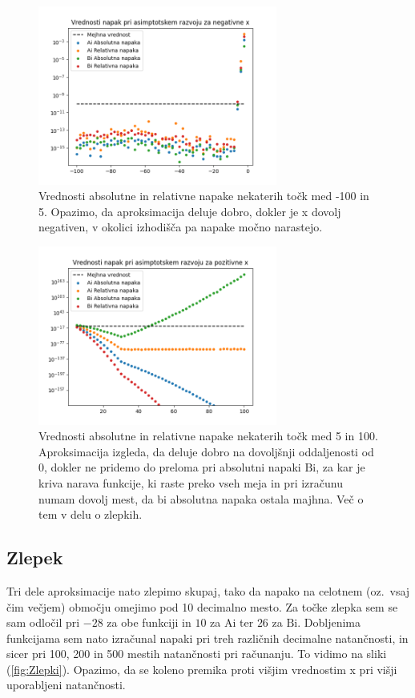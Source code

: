 \documentclass[12pt]{article}
\newcommand{\Ai}{\mathrm{Ai}}
\newcommand{\Bi}{\mathrm{Bi}}
\begin{document}
\begin{figure}
    \centering
    \includegraphics[width=0.7\textwidth]{NapakeAsimptotskoNeg.png}
    \caption{\label{fig:NapakeNeg} Vrednosti absolutne in relativne napake nekaterih točk med -100 in 5. Opazimo, da aproksimacija deluje dobro, dokler je x dovolj negativen, v okolici izhodišča pa napake močno narastejo.}
\end{figure}
\begin{figure}
    \centering
    \includegraphics[width=0.7\textwidth]{NapakeAsimptotskoPoz.png}
    \caption{\label{fig:NapakePoz} Vrednosti absolutne in relativne napake nekaterih točk med 5 in 100. Aproksimacija izgleda, da deluje dobro na dovoljšnji oddaljenosti od 0, dokler ne pridemo do preloma pri absolutni napaki $\Bi$, za kar je kriva narava funkcije, ki raste preko vseh meja in pri izračunu numam dovolj mest, da bi absolutna napaka ostala majhna. Več o tem v delu o zlepkih.}
\end{figure}

\subsection{Zlepek}
Tri dele aproksimacije nato zlepimo skupaj, tako da napako na celotnem (oz.\ vsaj čim večjem) območju omejimo pod 10 decimalno mesto. Za točke zlepka sem se sam odločil pri $\num{-28}$ za obe funkciji in $\num{10}$ za $\Ai$ ter $\num{26}$ za $\Bi$. Dobljenima funkcijama sem nato izračunal napaki pri treh različnih decimalne natančnosti, in sicer pri 100, 200 in 500 mestih natančnosti pri računanju. To vidimo na sliki (\ref{fig:Zlepki}). Opazimo, da se koleno premika proti višjim vrednostim x pri višji uporabljeni natančnosti.
\end{document}
